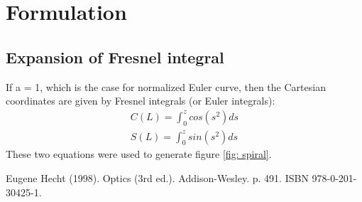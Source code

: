 \documentclass[a4paper, 10pt]{article}
\begin{document}
\section{Formulation}
\subsection{Expansion of Fresnel integral}
If a = 1, which is the case for normalized Euler curve, then the Cartesian coordinates are given by Fresnel integrals (or Euler integrals):
\begin{align*}
	C(L) = \int^z_0 cos(s^2)ds \\
	S(L) = \int^z_0 sin(s^2)ds 
\end{align*}
These two equations were used to generate figure \ref{fig: spiral}.

\begin{thebibliography}{}
	 Eugene Hecht (1998). Optics (3rd ed.). Addison-Wesley. p. 491. ISBN 978-0-201-30425-1.
\end{thebibliography}
\end{document}
